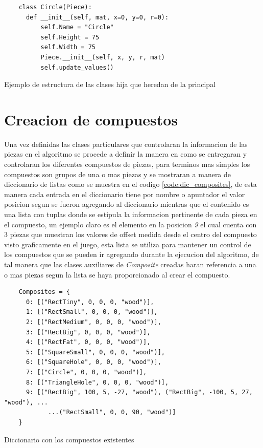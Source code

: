 \begin{listing}[ht]
  \begin{verbatim}
    class Circle(Piece):
      def __init__(self, mat, x=0, y=0, r=0):
          self.Name = "Circle"
          self.Height = 75
          self.Width = 75
          Piece.__init__(self, x, y, r, mat)
          self.update_values()
  \end{verbatim}
  \caption{Ejemplo de estructura de las clases hija que heredan de la principal}
  \label{code:dic_individual_piece}
\end{listing}


\section{Creacion de compuestos}
\label{section:composite_creation}

Una vez definidas las clases particulares que controlaran la informacion de las
piezas en el algoritmo se procede a definir la manera en como se entregaran y
controlaran los diferentes compuestos de piezas, para terminos mas simples los
compuestos son grupos de una o mas piezas y se mostraran a manera de diccionario
de listas como se muestra en el codigo \ref{code:dic_composites}, de esta manera
cada entrada en el diccionario tiene por nombre o apuntador el valor posicion
segun se fueron agregando al diccionario mientras que el contenido es una lista
con tuplas donde se estipula la informacion pertinente de cada pieza en el
compuesto, un ejemplo claro es el elemento en la posicion \textit{9} el cual
cuenta con 3 piezas que muestran los valores de offset medida desde el centro
del compuesto visto graficamente en el juego, esta lista se utiliza para
mantener un control de los compuestos que se pueden ir agregando durante la
ejecucion del algoritmo, de tal manera que las clases auxiliares de
\textit{Composite} creadas haran referencia a una o mas piezas segun la lista se
haya proporcionado al crear el compuesto.

\begin{listing}[ht]
  \begin{verbatim}
    Composites = {
      0: [("RectTiny", 0, 0, 0, "wood")],
      1: [("RectSmall", 0, 0, 0, "wood")],
      2: [("RectMedium", 0, 0, 0, "wood")],
      3: [("RectBig", 0, 0, 0, "wood")],
      4: [("RectFat", 0, 0, 0, "wood")],
      5: [("SquareSmall", 0, 0, 0, "wood")],
      6: [("SquareHole", 0, 0, 0, "wood")],
      7: [("Circle", 0, 0, 0, "wood")],
      8: [("TriangleHole", 0, 0, 0, "wood")],
      9: [("RectBig", 100, 5, -27, "wood"), ("RectBig", -100, 5, 27, "wood"), ...
            ...("RectSmall", 0, 0, 90, "wood")]
    } 
  \end{verbatim}
  \caption{Diccionario con los compuestos existentes}
  \label{code:dic_composites}
\end{listing}


